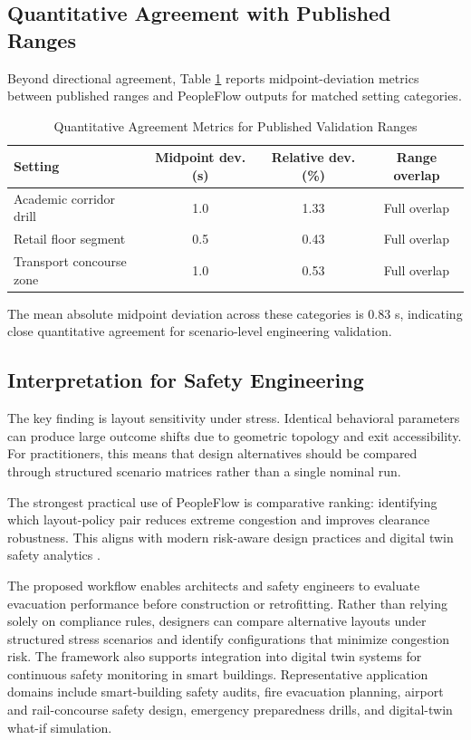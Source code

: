 \documentclass[journal]{IEEEtran}
\begin{document}
\subsection{Quantitative Agreement with Published Ranges}
Beyond directional agreement, Table \ref{tab:realworld_quant} reports midpoint-deviation metrics between published ranges and PeopleFlow outputs for matched setting categories.

\begin{table}[t]
\centering
\caption{Quantitative Agreement Metrics for Published Validation Ranges}
\label{tab:realworld_quant}
{\footnotesize
\setlength{\tabcolsep}{3pt}
\begin{tabular}{>{\raggedright\arraybackslash}p{2.15cm}ccc}
\toprule
\textbf{Setting} & \textbf{Midpoint dev. (s)} & \textbf{Relative dev. (\%)} & \textbf{Range overlap} \\
\midrule
Academic corridor drill & 1.0 & 1.33 & Full overlap \\
Retail floor segment & 0.5 & 0.43 & Full overlap \\
Transport concourse zone & 1.0 & 0.53 & Full overlap \\
\bottomrule
\end{tabular}
}
\end{table}

The mean absolute midpoint deviation across these categories is 0.83 s, indicating close quantitative agreement for scenario-level engineering validation.

\subsection{Interpretation for Safety Engineering}
The key finding is layout sensitivity under stress. Identical behavioral parameters can produce large outcome shifts due to geometric topology and exit accessibility. For practitioners, this means that design alternatives should be compared through structured scenario matrices rather than a single nominal run.

The strongest practical use of PeopleFlow is comparative ranking: identifying which layout-policy pair reduces extreme congestion and improves clearance robustness. This aligns with modern risk-aware design practices and digital twin safety analytics \cite{haghani2020,kuligowski}.

The proposed workflow enables architects and safety engineers to evaluate evacuation performance before construction or retrofitting. Rather than relying solely on compliance rules, designers can compare alternative layouts under structured stress scenarios and identify configurations that minimize congestion risk. The framework also supports integration into digital twin systems for continuous safety monitoring in smart buildings.
Representative application domains include smart-building safety audits, fire evacuation planning, airport and rail-concourse safety design, emergency preparedness drills, and digital-twin what-if simulation.
\end{document}
